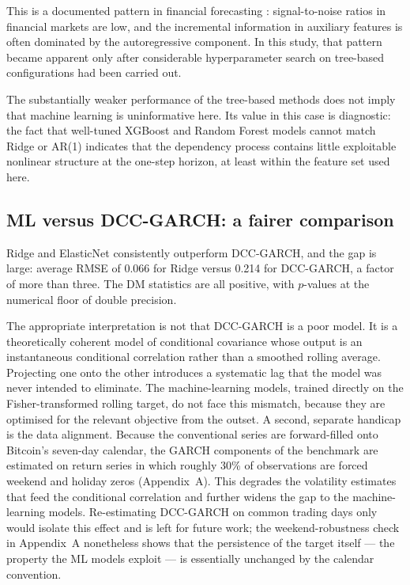 This is a documented pattern in financial forecasting \cite{welch2008}: signal-to-noise ratios in financial markets are low, and the incremental information in auxiliary features is often dominated by the autoregressive component. In this study, that pattern became apparent only after considerable hyperparameter search on tree-based configurations had been carried out.

The substantially weaker performance of the tree-based methods does not imply that machine learning is uninformative here. Its value in this case is diagnostic: the fact that well-tuned XGBoost and Random Forest models cannot match Ridge or AR(1) indicates that the dependency process contains little exploitable nonlinear structure at the one-step horizon, at least within the feature set used here.

\subsection{ML versus DCC-GARCH: a fairer comparison}

Ridge and ElasticNet consistently outperform DCC-GARCH, and the gap is large: average RMSE of 0.066 for Ridge versus 0.214 for DCC-GARCH, a factor of more than three. The DM statistics are all positive, with $p$-values at the numerical floor of double precision.

The appropriate interpretation is not that DCC-GARCH is a poor model. It is a theoretically coherent model of conditional covariance whose output is an instantaneous conditional correlation rather than a smoothed rolling average. Projecting one onto the other introduces a systematic lag that the model was never intended to eliminate. The machine-learning models, trained directly on the Fisher-transformed rolling target, do not face this mismatch, because they are optimised for the relevant objective from the outset. A second, separate handicap is the data alignment. Because the conventional series are forward-filled onto Bitcoin's seven-day calendar, the GARCH components of the benchmark are estimated on return series in which roughly 30\% of observations are forced weekend and holiday zeros (Appendix~A). This degrades the volatility estimates that feed the conditional correlation and further widens the gap to the machine-learning models. Re-estimating DCC-GARCH on common trading days only would isolate this effect and is left for future work; the weekend-robustness check in Appendix~A nonetheless shows that the persistence of the target itself --- the property the ML models exploit --- is essentially unchanged by the calendar convention.

